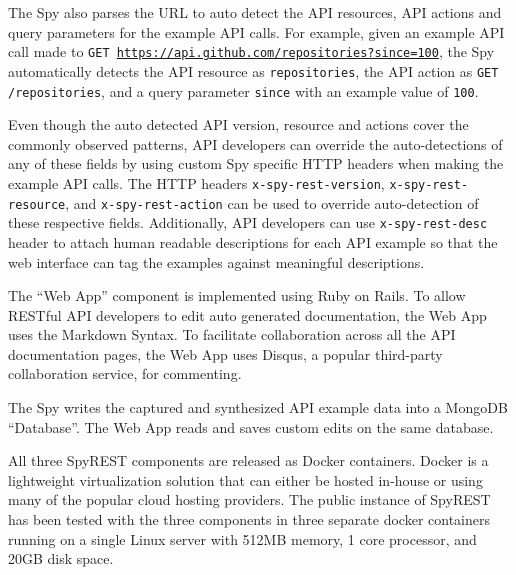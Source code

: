 The Spy also parses the URL to auto detect the API resources, API actions and query parameters for the example API calls. For example, given an example API call made to \texttt{GET \url{https://api.github.com/repositories?since=100}}, the Spy automatically detects the API resource as \texttt{repositories}, the API action as \texttt{GET /repositories}, and a query parameter \texttt{since} with an example value of \texttt{100}.

Even though the auto detected API version, resource and actions cover the commonly observed patterns, API developers can override the auto-detections of any of these fields by using custom Spy specific HTTP headers when making the example API calls. The HTTP headers \texttt{x-spy-rest-version}, \texttt{x-spy-rest-resource}, and \texttt{x-spy-rest-action} can be used to override auto-detection of these respective fields. Additionally, API developers can use \texttt{x-spy-rest-desc} header to attach human readable descriptions for each API example so that the web interface can tag the examples against meaningful descriptions.

The ``Web App'' component is implemented using Ruby on Rails. To allow RESTful API developers to edit auto generated documentation, the Web App uses the Markdown Syntax. To facilitate collaboration across all the API documentation pages, the Web App uses Disqus, a popular third-party collaboration service, for commenting.

The Spy writes the captured and synthesized API example data into a MongoDB ``Database''. The Web App reads and saves custom edits on the same database.

All three SpyREST components are released as Docker containers. Docker is a lightweight virtualization solution that can either be hosted in-house or using many of the popular cloud hosting providers. The public instance of SpyREST has been tested with the three components in three separate docker containers running on a single Linux server with 512MB memory, 1 core processor, and 20GB disk space.

